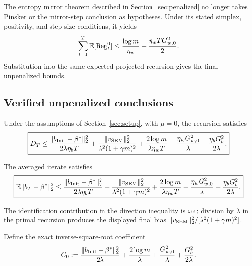 The entropy mirror theorem described in Section~\ref{sec:penalized} no longer
takes Pinsker or the mirror-step conclusion as hypotheses.  Under its stated
simplex, positivity, and step-size conditions, it yields
\begin{equation}
  \sum_{t=1}^T\mathbb{E}[\operatorname{Reg}_t^0]
  \le
  \frac{\log m}{\eta_w}
  +\frac{\eta_wT G_{w,0}^2}{2}.
  \label{eq:unpenalized-static-regret}
\end{equation}
Substitution into the same expected projected recursion gives the final
unpenalized bounds.

\subsection{Verified unpenalized conclusions}

\begin{theorem}
\label{thm:unpenalized-fixed-comparator}
Under the assumptions of Section~\ref{sec:setup}, with $\mu=0$, the recursion
satisfies
\begin{equation}
  \boxed{
  D_T
  \le
  \frac{\|b_{\rm Init}-\beta^*\|_2^2}
       {2\lambda\eta_bT}
  +\frac{\|v_{\rm SEM}\|_2^2}
       {\lambda^2(1+\gamma m)^2}
  +\frac{2\log m}{\lambda\eta_wT}
  +\frac{\eta_wG_{w,0}^2}{\lambda}
  +\frac{\eta_bG_b^2}{2\lambda}.}
  \label{eq:unpenalized-average-bound}
\end{equation}
\end{theorem}

\begin{theorem}
\label{thm:unpenalized-averaged-iterate}
The averaged iterate satisfies
\begin{equation}
  \boxed{
  \mathbb{E}\|\bar b_T-\beta^*\|_2^2
  \le
  \frac{\|b_{\rm Init}-\beta^*\|_2^2}
       {2\lambda\eta_bT}
  +\frac{\|v_{\rm SEM}\|_2^2}
       {\lambda^2(1+\gamma m)^2}
  +\frac{2\log m}{\lambda\eta_wT}
  +\frac{\eta_wG_{w,0}^2}{\lambda}
  +\frac{\eta_bG_b^2}{2\lambda}.}
  \label{eq:unpenalized-averaged-iterate-bound}
\end{equation}
\end{theorem}

The identification contribution in the direction inequality is
$\varepsilon_{\rm id}$; division by $\lambda$ in the primal recursion produces
the displayed final bias
$\|v_{\rm SEM}\|_2^2/[\lambda^2(1+\gamma m)^2]$.

Define the exact inverse-square-root coefficient
\begin{equation}
  C_0
  :=\frac{\|b_{\rm Init}-\beta^*\|_2^2}{2\lambda}
    +\frac{2\log m}{\lambda}
    +\frac{G_{w,0}^2}{\lambda}
    +\frac{G_b^2}{2\lambda}.
  \label{eq:unpenalized-rate-constant}
\end{equation}

